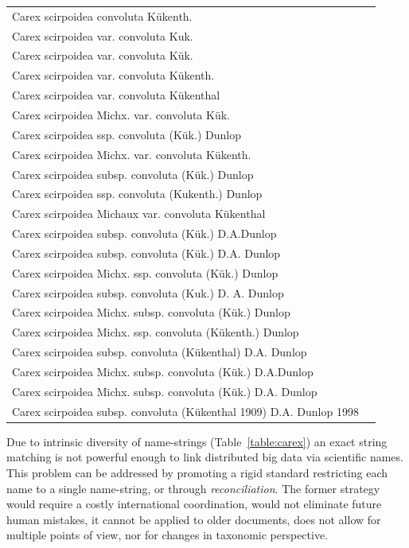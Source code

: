 \documentclass{bmcart}
\begin{document}
\begin{table}[!htb]
\begin{center}
\begin{tabular}{| l | c |}
    Carex scirpoidea convoluta Kükenth. & \\
    Carex scirpoidea var. convoluta Kuk. & \\
    Carex scirpoidea var. convoluta Kük. & \\
    Carex scirpoidea var. convoluta Kükenth. & \\
    Carex scirpoidea var. convoluta Kükenthal & \\
    Carex scirpoidea Michx. var. convoluta Kük. & \\
    Carex scirpoidea ssp. convoluta (Kük.) Dunlop & \\
    Carex scirpoidea Michx. var. convoluta Kükenth. & \\
    Carex scirpoidea subsp. convoluta (Kük.) Dunlop & \\
    Carex scirpoidea ssp. convoluta (Kukenth.) Dunlop & \\
    Carex scirpoidea Michaux var. convoluta Kükenthal & \\
    Carex scirpoidea subsp. convoluta (Kük.) D.A.Dunlop & \\
    Carex scirpoidea subsp. convoluta (Kük.) D.A. Dunlop & \\
    Carex scirpoidea Michx. ssp. convoluta (Kük.) Dunlop & \\
    Carex scirpoidea subsp. convoluta (Kuk.) D. A. Dunlop & \\
    Carex scirpoidea Michx. subsp. convoluta (Kük.) Dunlop & \\
    Carex scirpoidea Michx. ssp. convoluta (Kükenth.) Dunlop & \\
    Carex scirpoidea subsp. convoluta (Kükenthal) D.A. Dunlop & \\
    Carex scirpoidea Michx. subsp. convoluta (Kük.) D.A.Dunlop & \\
    Carex scirpoidea Michx. subsp. convoluta (Kük.) D.A. Dunlop & \\
    Carex scirpoidea subsp. convoluta (Kükenthal 1909) D.A. Dunlop 1998 & \\
    \hline
    \end{tabular}
  \end{center}
\end{table}

Due to intrinsic diversity of name-strings (Table~\ref{table:carex}) an exact
string matching is not powerful enough to link distributed big data via
scientific names. This problem can be addressed by promoting a rigid standard
restricting each name to a single name-string, or through
\textit{reconciliation}. The former strategy would require a costly
international coordination, would not eliminate future human mistakes, it
cannot be applied to older documents, does not allow for multiple points of
view, nor for changes in taxonomic perspective.
\end{document}

